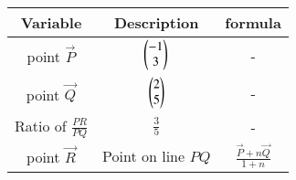 \begin{tabular}[15pt]{ |c|c|c|}
\hline
\textbf{Variable} & \textbf{Description} & \textbf{formula}\\
\hline
point $\vec{P}$ & $\begin{pmatrix}-1 \\ 3\end{pmatrix}$ & - \\
\hline 
point $\vec{Q}$ & $\begin{pmatrix}2 \\ 5\end{pmatrix}$ & -\\
\hline
Ratio of $\frac{PR}{PQ}$ & $\frac{3}{5}$ & -\\
\hline
point $\vec{R}$ & Point on line $PQ$ & $\frac{\vec{P}+n\vec{Q}}{1+n}$\\
\hline
\end{tabular}
